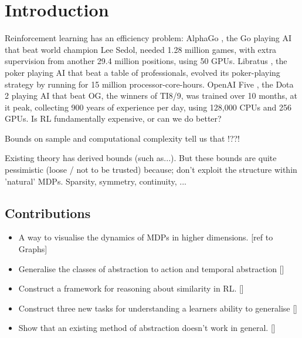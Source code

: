 \chapter{Introduction}\label{C:intro}

Reinforcement learning has an efficiency problem: AlphaGo \cite{Silver2016a}, the Go
playing AI that beat world champion Lee Sedol, needed 1.28 million games, with
extra supervision from another 29.4 million positions, using 50 GPUs.
Libratus \cite{Brown2018b}, the poker playing AI that beat a table of professionals,
evolved its poker-playing strategy by running for 15 million processor-core-hours.
OpenAI Five \cite{Berner2019}, the Dota 2 playing AI that beat OG, the winners of TI8/9, was
trained over 10 months, at it peak, collecting 900 years of experience per day, using
128,000 CPUs and 256 GPUs. Is RL fundamentally expensive, or can we do better?

Bounds on sample and computational complexity tell us that !??!



Existing theory has derived bounds (such as...). But these bounds are quite pessimistic (loose / not to be trusted) because;
don't exploit the structure within 'natural' MDPs. Sparsity, symmetry, continuity, ...


\section{Contributions}

\begin{itemize}
  \item A way to visualise the dynamics of MDPs in higher dimensions. [ref to Graphs]
  \item Generalise the classes of abstraction to action and temporal abstraction []
  \item Construct a framework for reasoning about similarity in RL. []
  \item Construct three new tasks for understanding a learners ability to generalise []
  \item Show that an existing method of abstraction doesn't work in general. []
\end{itemize}
